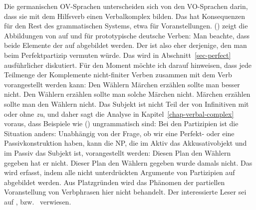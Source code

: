 Die germanischen OV-Sprachen unterscheiden sich von den VO-Sprachen darin, dass sie mit dem
Hilfsverb einen Verbalkomplex bilden. Das hat Konsequenzen für den Rest des grammatischen Systems, etwa für
Voranstellungen. () zeigt die Abbildungen von \argst auf \spr und \comps für prototypische deutsche Verben:
\ea
\label{partizipien-hm-zwei}%
\z
Man beachte, dass beide Elemente der \argstl auf \comps abgebildet werden. Der \compsw ist also eher derjenige, den man
beim Perfektpartizip vermuten würde. Das wird in Abschnitt~\ref{sec-perfect} ausführlicher diskutiert.
Für den Moment möchte ich darauf hinweisen, dass jede Teilmenge der Komplemente nicht-finiter Verben zusammen
mit dem Verb vorangestellt werden kann:
\eal
\ex 
Den        Wählern Märchen erzählen sollte man besser nicht.
\ex 
Den        Wählern erzählen sollte man solche Märchen     nicht.
\ex 
Märchen     erzählen sollte man den        Wählern nicht.
\zl
Das Subjekt ist nicht Teil der \compsl von Infinitiven mit oder ohne \emph{zu}, und daher sagt die
Analyse in Kapitel~\ref{chap-verbal-complex} voraus, dass Beispiele wie ()
ungrammatisch sind:
\eal
{}
\zl
Bei den Partizipien ist die Situation anders: Unabhängig von der Frage, ob wir eine
Perfekt- oder eine Passivkonstruktion haben, kann die NP, die im Aktiv das Akkusativobjekt und im
Passiv das Subjekt ist, vorangestellt werden:
\eal
\ex 
Diesen      Plan den        Wählern gegeben hat er nicht.
\ex 
Dieser Plan den Wählern gegeben wurde damals nicht.
\zl
Das wird erfasst, indem alle nicht unterdrückten Argumente von Partizipien auf \comps abgebildet werden. Aus Platzgründen wird das Phänomen der partiellen Voranstellung von Verbphrasen hier nicht behandelt. Der interessierte
Leser sei auf ,  bzw.\  verwiesen.

